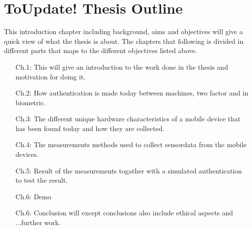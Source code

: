 \section{\textbf{ToUpdate! }Thesis Outline}\label{sec:outline}
This introduction chapter including background, aims and objectives will give a quick view of what the thesis is about. The chapters that following is divided in different parts that maps to the different objectives listed above.
\begin{itemize}
	\item[Ch.1:]	This will give an introduction to the work done in the thesis and motivation for doing it.
	\item[Ch.2:]	How authentication is made today between machines, two factor and in biometric.
	\item[Ch.3:]	The different unique hardware characteristics of a mobile device that has been found today and how they are collected.
	\item[Ch.4:]	The measurements methods used to collect sensordata from the mobile devices.
	\item[Ch.5:]	Result of the measurements togather with a simulated authentication to test the result. 
	\item[Ch.6:]	Demo
	\item[Ch.6:]	Conclusion will except conclusions also include ethical aspects and ...further work. 
\end{itemize}
